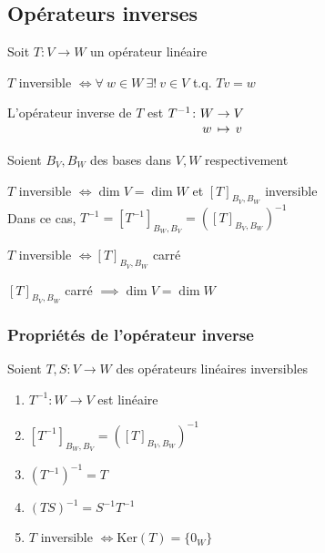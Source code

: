 
\subsection{Opérateurs inverses}
Soit $T\colon V \to W$ un opérateur linéaire
\begin{definition}
    $T$ inversible $\iff \forall \ w \in W \ \exists! \ v \in V$ t.q. $Tv = w$
\end{definition}
\begin{definition}
    L'opérateur inverse de $T$ est $\myfunc{T^{-1}}{W}{V}{w}{v}$ 
\end{definition}
Soient $B_V, B_W$ des bases dans $V, W$ respectivement 
\begin{theorem}
    $T$ inversible $\iff \dim V = \dim W$ et $[T]_{B_V, B_W}$ inversible \\
    Dans ce cas, $T^{-1} = [T^{-1}]_{B_W, B_V} = \left([T]_{B_V, B_W}\right)^{-1}$
\end{theorem}
\begin{corollary}
    $T$ inversible $\iff [T]_{B_V, B_W}$ carré
\end{corollary}
\begin{remark}
    $[T]_{B_V, B_W}$ carré $\implies \dim V = \dim W$
\end{remark}

\subsubsection{Propriétés de l'opérateur inverse}
Soient $T, S\colon V \to W$ des opérateurs linéaires inversibles
\begin{enumerate}
    \item $T^{-1}\colon W \to V$ est linéaire
    \item $[T^{-1}]_{B_W, B_V} = \left([T]_{B_V, B_W}\right)^{-1}$
    \item $\left(T^{-1}\right)^{-1} = T$
    \item $(TS)^{-1} = S^{-1}T^{-1}$
    \item $T$ inversible $\iff \text{Ker}(T) = \{0_W\}$
\end{enumerate}

